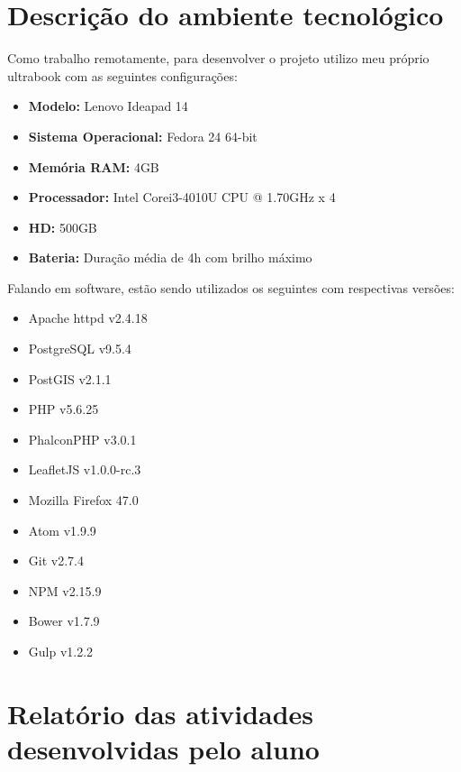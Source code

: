 \documentclass{ufscar}
\begin{document}
\section{Descrição do ambiente tecnológico}
Como trabalho remotamente, para desenvolver o projeto utilizo meu próprio ultrabook com as seguintes configurações:
\begin{itemize}
  \item \textbf{Modelo:} Lenovo Ideapad 14
  \item \textbf{Sistema Operacional:} Fedora 24 64-bit
  \item \textbf{Memória RAM:} 4GB
  \item \textbf{Processador:} Intel\textsuperscript{\textregistered} Core\texttrademark  i3-4010U CPU @ 1.70GHz x 4
  \item \textbf{HD:} 500GB
  \item \textbf{Bateria:} Duração média de 4h com brilho máximo
\end{itemize}
Falando em software, estão sendo utilizados os seguintes com respectivas versões:
\begin{itemize}
  \item Apache httpd v2.4.18
  \item PostgreSQL v9.5.4
  \item PostGIS v2.1.1
  \item PHP v5.6.25
  \item PhalconPHP v3.0.1
  \item LeafletJS v1.0.0-rc.3
  \item Mozilla Firefox 47.0
  \item Atom v1.9.9
  \item Git v2.7.4
  \item NPM v2.15.9
  \item Bower v1.7.9
  \item Gulp v1.2.2
\end{itemize}

\section{Relatório das atividades desenvolvidas pelo aluno}
\end{document}
